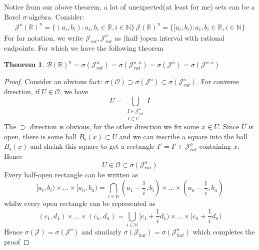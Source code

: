 \documentclass{article}
\newtheorem{theorem}{Theorem}[section]
\theoremstyle{definition}
\newcommand{\m}[1]{$ #1 $}
\begin{document}
Notice from our above theorem, a lot of unexpected(at least for me) sets can be a Borel \m{\sigma}-algebra. Consider: 
\begin{align*}
	\mathscr{J}^{o}(\mathbb{R})^{n} = \{(a_i,b_i):a_i,b_i \in \mathbb{R}, i \in \mathbb{N}\} \,
        \mathscr{J}(\mathbb{R})^{n} = \{[a_i,b_i):a_i,b_i \in \mathbb{R}, i \in \mathbb{N}\} 
\end{align*}
For for notation, we write \m{\mathscr{J}_{rat},\mathscr{J}^{o}_{rat}} as (half-)open interval with rational endpoints. For which we have the following theorem
\begin{theorem}
	\m{\mathscr{B}(\mathbb{R})^n = \sigma(\mathscr{J}^{n}_{rat}) =  \sigma(\mathscr{J}^{o,n}_{rat}) =  \sigma(\mathscr{J}^{n}) =  \sigma(\mathscr{J}^{n,o}) }
\end{theorem}
\begin{proof}
	Consider an obvious fact: \m{\sigma(\mathscr{O}) \supset \sigma(\mathscr{J}^{o}) \subset \sigma(\mathscr{J}^{o}_{rat}) }. For converse direction, if \m{U \in \mathscr{O}}, we have 
	\begin{equation*}
		U = \bigcup_{\substack{I \in \mathscr{J}^{o}_{rat} \\ I \subset U}} I
	\end{equation*}
	The \m{ \supset} direction is obvious, for the other direction we fix some \m{x \in U}. Since \m{U} is open, there is some ball \m{ B_{\epsilon}(x) \subset U} and we can inscribe a square into the ball \m{ B_{\epsilon}(x)} and shrink this square to get a rectangle \m{ I' = I' \in \mathscr{J}^o_{rat}} containing \m{x}. Hence 
	\begin{equation*}
		U \in \mathscr{O} \subset \sigma(\mathscr{J}^{o}_{rat})
	\end{equation*}
	Every half-open rectangle can be written as 
	\begin{equation*}
		[a_i,b_i) \times \dots \times [a_n,b_n) = \bigcap_{i \in \mathbb{N}}(a_1 - \frac{1}{i},b_i) \times \dots \times (a_n - \frac{1}{i},b_n)
	\end{equation*}
	whilw every open rectangle can be represented as 
	\begin{equation*}
		(c_1,d_1) \times \dots \times (c_n,d_n) = \bigcup_{i \in \mathbb{N}} [c_1 + \frac{1}{i}d_1) \times \dots \times [c_n + \frac{1}{i}d_n)
	\end{equation*}
	Hence \m{\sigma(\mathscr{J}) = \sigma(\mathscr{J}^{o})} and similarly   \m{\sigma(\mathscr{J}_{hat}) = \sigma(\mathscr{J}^{o}_{hat})} which completes the proof
\end{proof}
\end{document}
